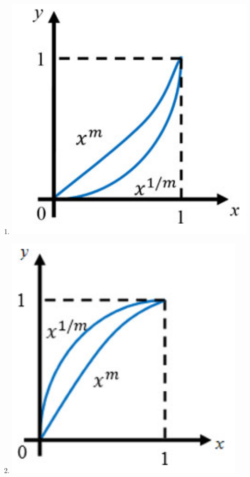 \documentclass[12pt,onecolumn]{article}
\begin{document}
\begin{enumerate}
\begin{enumerate}
              \item \includegraphics[scale=0.2]{o9c}
              \item \includegraphics[scale=0.2]{o9d}
          \end{enumerate}


\end{enumerate}
\end{document}
